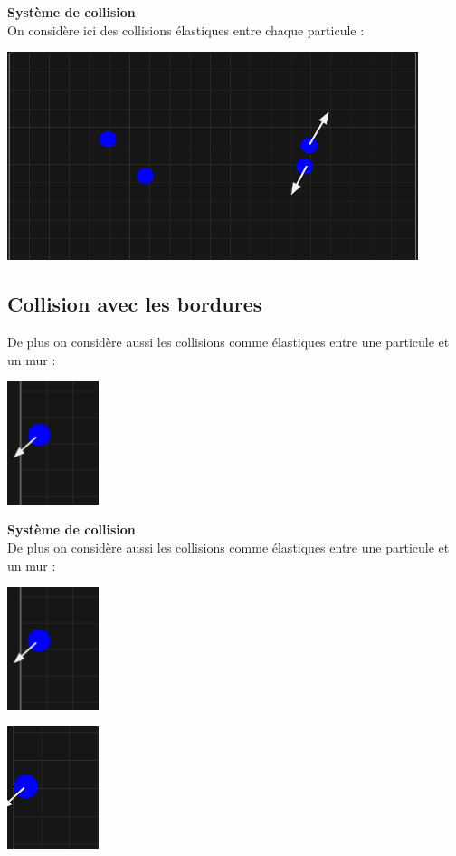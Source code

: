 \documentclass{article}
\begin{document}
\newpage
\vspace*{2pt}
\thispagestyle{landscape}
\textbf{Système de collision}
\\On considère ici des collisions élastiques entre chaque particule : 
\begin{center}
    \includegraphics[width=0.9\textwidth]{CollisionP5.png}
\end{center}


\newpage
\vspace*{2pt}
\thispagestyle{landscape}
\subsection{Collision avec les bordures}
De plus on considère aussi les collisions comme élastiques entre une particule et un mur : \\[64pt]
\parbox{0.25\textwidth}{
    \includegraphics[width=0.20\textwidth]{CollisionM1.png}
}


\newpage
\vspace*{2pt}
\thispagestyle{landscape}
\textbf{Système de collision}\\
De plus on considère aussi les collisions comme élastiques entre une particule et un mur : \\[64pt]
\parbox{0.25\textwidth}{
    \includegraphics[width=0.20\textwidth]{CollisionM1.png}
}
\parbox{0.25\textwidth}{
    \includegraphics[width=0.20\textwidth]{CollisionM2.png}
}
\end{document}
